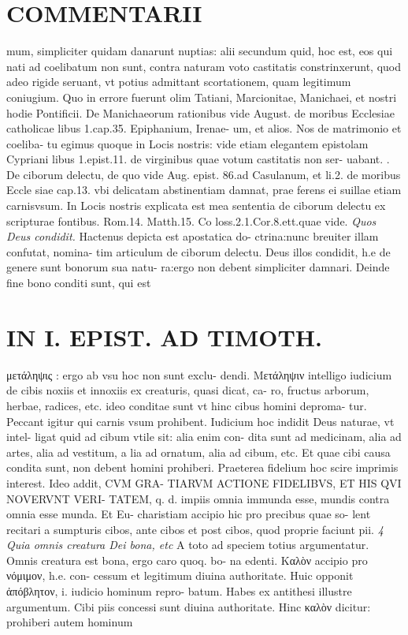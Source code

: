 \documentclass{article}
\begin{document}
\begin{pages}
\section*{COMMENTARII }
\marginpar{[ p.90 ]}\pstart mum, simpliciter quidam danarunt nuptias: alii secundum quid, hoc est, eos qui nati ad coelibatum non sunt, contra naturam voto castitatis constrinxerunt, quod adeo rigide seruant, vt potius admittant scortationem, quam legitimum coniugium. Quo in errore fuerunt olim Tatiani, Marcionitae, Manichaei, et nostri hodie Pontificii. De Manichaeorum rationibus vide August. de moribus Ecclesiae catholicae libus 1.cap.35. Epiphanium, Irenae- um, et alios. Nos de matrimonio et coeliba- tu egimus quoque in Locis nostris: vide etiam elegantem epistolam Cypriani libus 1.epist.11. de virginibus quae votum castitatis non ser- uabant.  \pend{}. De ciborum delectu, de quo vide Aug. epist. 86.ad Casulanum, et li.2. de moribus  Eccle siae cap.13. vbi delicatam abstinentiam damnat, prae ferens ei suillae etiam carnisvsum. In Locis nostris explicata est mea sententia de ciborum delectu ex scripturae fontibus. Rom.14. Matth.15. Co loss.2.1.Cor.8.ett.quae vide.  \pend
\textit{Quos Deus condidit. }\pstart Hactenus depicta est apostatica do- ctrina:nunc breuiter illam confutat, nomina- tim articulum de ciborum delectu. Deus illos condidit, h.e de genere sunt bonorum sua natu- ra:ergo non debent simpliciter damnari.  \pend\pstart Deinde fine bono conditi sunt, qui est  \pend
\section*{IN I. EPIST. AD TIMOTH. }
\marginpar{[ p.91 ]}\pstart μετάληψις : ergo ab vsu hoc non sunt exclu- dendi. Μετάληψιν intelligo iudicium de cibis noxiis et innoxiis ex creaturis, quasi dicat, ca- ro, fructus arborum, herbae, radices, etc. ideo conditae sunt vt hinc cibus homini deproma- tur. Peccant igitur qui carnis vsum prohibent. Iudicium hoc indidit Deus naturae, vt intel- ligat quid ad cibum vtile sit: alia enim con- dita sunt ad medicinam, alia ad artes, alia ad vestitum, a lia ad ornatum, alia ad cibum, etc. Et quae cibi causa condita sunt, non debent homini prohiberi. Praeterea fidelium hoc scire imprimis interest. Ideo addit, CVM GRA- TIARVM ACTIONE FIDELIBVS, ET HIS QVI NOVERVNT VERI- TATEM, q. d. impiis omnia immunda esse, mundis contra omnia esse munda. Et Eu- charistiam accipio hic pro precibus quae so- lent recitari a sumpturis cibos, ante cibos et post cibos, quod proprie faciunt pii.  \pend
\textit{4 Quia omnis creatura Dei bona, etc }\pstart A toto ad speciem totius argumentatur. Omnis creatura est bona, ergo caro quoq. bo- na edenti. Καλὸν accipio pro νόμιμον, h.e. con- cessum et legitimum diuina authoritate. Huic opponit ἀπόβλητον, i. iudicio hominum repro- batum. Habes ex antithesi illustre argumentum. Cibi piis concessi sunt diuina authoritate. Hinc καλὸν dicitur: prohiberi autem hominum  \pend

\end{pages}
\end{document}
